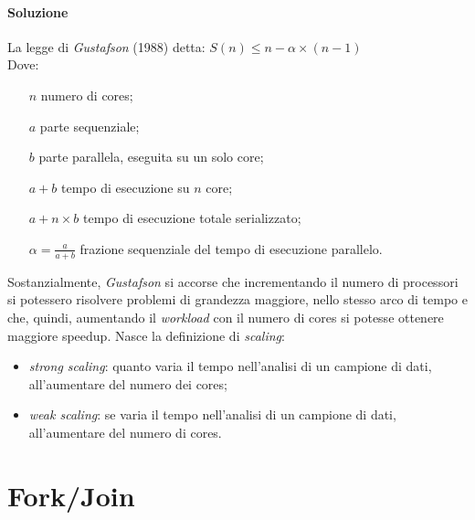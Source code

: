 \begin{enumerate}
	\paragraph{Soluzione}
	La legge di \textit{Gustafson} (1988) detta: $S(n) \leq n - \alpha\times(n-1)$ \\
	Dove:
	\begin{itemize}
		\item[$n$] numero di cores;
		\item[$a$] parte sequenziale;
		\item[$b$] parte parallela, eseguita su un solo core;
		\item[$a+b$] tempo di esecuzione su $n$ core;
		\item[$a+n\times b$] tempo di esecuzione totale serializzato;
		\item[$\alpha = \frac{a}{a+b}$] frazione sequenziale del tempo di esecuzione parallelo.
	\end{itemize}
	Sostanzialmente, \textit{Gustafson} si accorse che incrementando il numero di processori si potessero risolvere problemi di grandezza maggiore, nello stesso arco di tempo e che, quindi, aumentando il \textit{workload} con il numero di cores si potesse ottenere maggiore speedup. Nasce la definizione di \textit{scaling}:
	\begin{itemize}
		\item \textit{strong scaling}: quanto varia il tempo nell'analisi di un campione di dati, all'aumentare del numero dei cores;
		\item \textit{weak scaling}: se varia il tempo nell'analisi di un campione di dati, all'aumentare del numero di cores.
	\end{itemize}
\end{enumerate}

\newpage

\section{Fork/Join}

